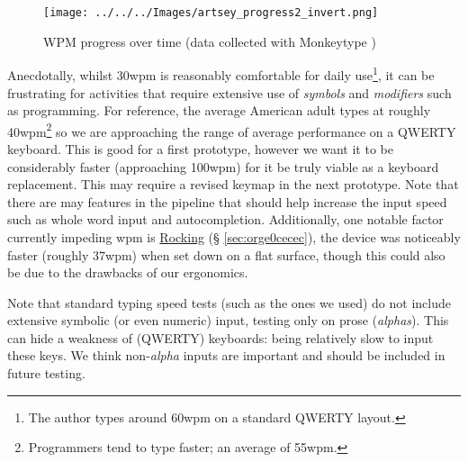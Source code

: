 \documentclass[logo,bsc,singlespacing,parskip]{infthesis}
\begin{document}
\begin{figure}[h]
\centering
\texttt{[image: ../../../Images/artsey\_progress2\_invert.png]}
\caption[WPM progress over time]{\label{fig:wpm}WPM progress over time (data collected with Monkeytype \autocite{miodecMonkeytype})}
\end{figure}

Anecdotally, whilst 30wpm is reasonably comfortable for daily use\footnote{The author types around 60wpm on a standard QWERTY layout.}, it can be frustrating for activities that require extensive use of \emph{symbols} and \emph{modifiers} such as programming.
For reference, the average American adult types at roughly 40wpm\footnote{Programmers tend to type faster; an average of 55wpm.} \autocite{WhatAverageTyping} so we are approaching the range of average performance on a QWERTY keyboard.
This is good for a first prototype, however we want it to be considerably faster (approaching 100wpm) for it be truly viable as a keyboard replacement.
This may require a revised keymap in the next prototype.
Note that there are may features in the pipeline that should help increase the input speed such as whole word input and autocompletion.
Additionally, one notable factor currently impeding wpm is
\hyperref[sec:orge0cecec]{Rocking} (§ \ref{sec:orge0cecec}),  the device was noticeably faster (roughly 37wpm) when set down on a flat surface, though this could also be due to the drawbacks of our ergonomics. \medskip

Note that standard typing speed tests (such as the ones we used) do not include extensive symbolic (or even numeric) input, testing only on prose (\emph{alphas}). This can hide a weakness of (QWERTY) keyboards: being relatively slow to input these keys. We think non-\emph{alpha} inputs are important and should be included in future testing.
\end{document}
